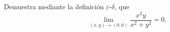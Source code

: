 Demuestra mediante la definición $\varepsilon$-$\delta$, que
\[
\lim_{(x,y)\to(0,0)} \frac{x^2 y}{x^2 + y^2} = 0.
\]